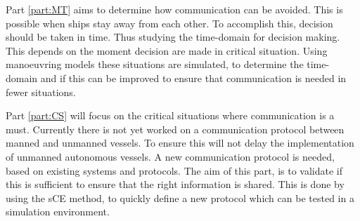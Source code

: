 Part \ref{part:MT} aims to determine how communication can be avoided. This is possible when ships stay away from each other. To accomplish this, decision should be taken in time. Thus studying the time-domain for decision making. This depends on the moment decision are made in critical situation. Using manoeuvring models these situations are simulated, to determine the time-domain and if this can be improved to ensure that communication is needed in fewer situations.

Part \ref{part:CS} will focus on the critical situations where communication is a must. Currently there is not yet worked on a communication protocol between manned and unmanned vessels. To ensure this will not delay the implementation of unmanned autonomous vessels. A new communication protocol is needed, based on existing systems and protocols. The aim of this part, is to validate if this is sufficient to ensure that the right information is shared. This is done by using the \acf{sCE} method, to quickly define a new protocol which can be tested in a simulation environment.
